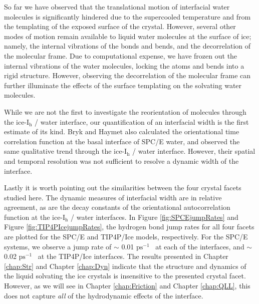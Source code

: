 So far we have observed that the translational motion of interfacial
water molecules is significantly hindered due to the supercooled
temperature and from the templating of the exposed surface of the
crystal. However, several other modes of motion remain available to
liquid water molecules at the surface of ice; namely, the internal
vibrations of the bonds and bends, and the decorrelation of the
molecular frame. Due to computational expense, we have frozen out the
internal vibrations of the water molecules, locking the atoms and
bends into a rigid structure. However, observing the decorrelation of
the molecular frame can further illuminate the effects of the surface
templating on the solvating water molecules.

While we are not the first to investigate the reorientation of
molecules through the ice-I$_\mathrm{h}$ / water interface, our
quantification of an interfacial width is the first estimate of its
kind. Bryk and Haymet also calculated the orientational time
correlation function at the basal interface of SPC/E
water,\cite{Bryk2002} and observed the same qualitative trend through
the ice-I$_\mathrm{h}$ / water interface. However, their spatial and
temporal resolution was not sufficient to resolve a dynamic width of
the interface.

Lastly it is worth pointing out the similarities between the four
crystal facets studied here. The dynamic measures of interfacial width
are in relative agreement, as are the decay constants of the
orientational autocorrelation function at the ice-I$_\mathrm{h}$ /
water interfaces. In Figure \ref{fig:SPCEjumpRates} and Figure
\ref{fig:TIP4PIcejumpRates}, the hydrogen bond jump rates for all four
facets are plotted for the SPC/E and TIP4P/Ice models,
respectively. For the SPC/E systems, we observe a jump rate of $\sim$
0.01 $\mathrm{ps}^{-1}$~ at each of the interfaces, and $\sim$ 0.02
$\mathrm{ps}^{-1}$~ at the TIP4P/Ice interfaces. The results presented
in Chapter \ref{chap:Str} and Chapter \ref{chap:Dyn} indicate that the
structure and dynamics of the liquid solvating the ice crystals is
insensitive to the presented crystal facet. However, as we will see in
Chapter \ref{chap:Friction} and Chapter \ref{chap:QLL}, this does not
capture \textit{all} of the hydrodynamic effects of the interface.


